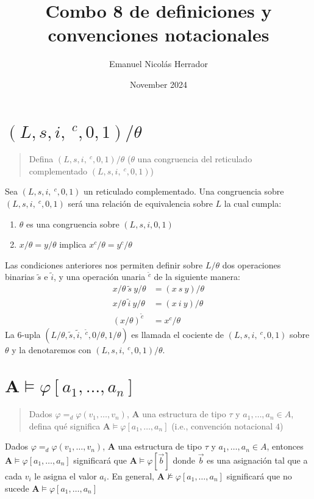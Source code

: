 \documentclass{article}
\title{Combo 8 de definiciones y convenciones notacionales}
\author{Emanuel Nicolás Herrador}
\date{November 2024}
\begin{document}
\maketitle

\section{$(L,s,i,\ ^c,0,1)/\theta$}
\begin{quote}
  Defina $(L,s,i,\ ^c,0,1)/\theta$ ($\theta$ una congruencia del reticulado complementado $(L,s,i,\ ^c,0,1)$)
\end{quote}
Sea $(L,s,i,\ ^c,0,1)$ un reticulado complementado. Una congruencia sobre $(L,s,i,\ ^c,0,1)$ será una relación de equivalencia sobre $L$ la cual cumpla:
\begin{enumerate}
  \item $\theta$ es una congruencia sobre $(L,s,i,0,1)$
  \item $x/\theta=y/\theta$ implica $x^c/\theta=y^c/\theta$
\end{enumerate}
Las condiciones anteriores nos permiten definir sobre $L/\theta$ dos operaciones binarias $\tilde{s}$ e $\tilde{i}$, y una operación unaria $^{\tilde{c}}$ de la siguiente manera:
\begin{equation*}
  \begin{aligned}
    x/\theta\ \tilde{s}\ y/\theta & = (x\ s\ y)/\theta \\
    x/\theta\ \tilde{i}\ y/\theta & = (x\ i\ y)/\theta \\
    (x/\theta)^{\tilde{c}}        & = x^c/\theta
  \end{aligned}
\end{equation*}
La $6$-upla $(L/\theta,\tilde{s},\tilde{i},\ ^{\tilde{c}},0/\theta,1/\theta)$ es llamada el cociente de $(L,s,i,\ ^c,0,1)$ sobre $\theta$ y la denotaremos con $(L,s,i,\ ^c,0,1)/\theta$.

\section{$\mathbf{A}\vDash\varphi[a_1,\dots,a_n]$}
\begin{quote}
  Dados $\varphi=_d\varphi(v_1,\dots,v_n)$, $\mathbf{A}$ una estructura de tipo $\tau$ y $a_1,\dots,a_n\in A$, defina qué significa $\mathbf{A}\vDash\varphi[a_1,\dots,a_n]$ (i.e., convención notacional $4$)
\end{quote}
Dados $\varphi=_d\varphi(v_1,\dots,v_n)$, $\mathbf{A}$ una estructura de tipo $\tau$ y $a_1,\dots,a_n\in A$, entonces $\mathbf{A}\vDash\varphi[a_1,\dots,a_n]$ significará que $\mathbf{A}\vDash\varphi[\vec{b}]$ donde $\vec{b}$ es una asignación tal que a cada $v_i$ le asigna el valor $a_i$.
\newline
En general, $\mathbf{A}\nvDash\varphi[a_1,\dots,a_n]$ significará que no sucede $\mathbf{A}\vDash\varphi[a_1,\dots,a_n]$
\end{document}
